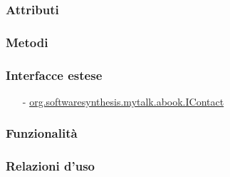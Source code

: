 \subsubsection*{Attributi}

\subsubsection*{Metodi}

\subsubsection*{Interfacce estese}
\begin{itemize}[noitemsep,nolistsep]
  \item[-] \hyperref[IContact]{\ttfamily{}org.softwaresynthesis.mytalk.abook.IContact}
\end{itemize}

\subsubsection*{Funzionalità}

\subsubsection*{Relazioni d'uso}

